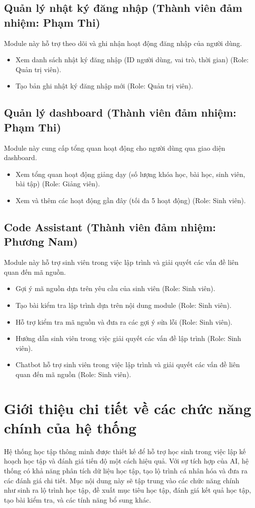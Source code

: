 \subsection{Quản lý nhật ký đăng nhập (Thành viên đảm nhiệm: Phạm Thi)}
Module này hỗ trợ theo dõi và ghi nhận hoạt động đăng nhập của người dùng.
\begin{itemize}[label=--]
    \item Xem danh sách nhật ký đăng nhập (ID người dùng, vai trò, thời gian) (Role: Quản trị viên).
    \item Tạo bản ghi nhật ký đăng nhập mới (Role: Quản trị viên).
\end{itemize}

\subsection{Quản lý dashboard (Thành viên đảm nhiệm: Phạm Thi)}
Module này cung cấp tổng quan hoạt động cho người dùng qua giao diện dashboard.
\begin{itemize}[label=--]
    \item Xem tổng quan hoạt động giảng dạy (số lượng khóa học, bài học, sinh viên, bài tập) (Role: Giảng viên).
    \item Xem và thêm các hoạt động gần đây (tối đa 5 hoạt động) (Role: Sinh viên).
\end{itemize}

\subsection{Code Assistant (Thành viên đảm nhiệm: Phương Nam)}
Module này hỗ trợ sinh viên trong việc lập trình và giải quyết các vấn đề liên quan đến mã nguồn.
\begin{itemize}[label=--]
    \item Gợi ý mã nguồn dựa trên yêu cầu của sinh viên (Role: Sinh viên).
    \item Tạo bài kiểm tra lập trình dựa trên nội dung module (Role: Sinh viên).
    \item Hỗ trợ kiểm tra mã nguồn và đưa ra các gợi ý sửa lỗi (Role: Sinh viên).
    \item Hướng dẫn sinh viên trong việc giải quyết các vấn đề lập trình (Role: Sinh viên).
    \item Chatbot hỗ trợ sinh viên trong việc lập trình và giải quyết các vấn đề liên quan đến mã nguồn (Role: Sinh viên).
\end{itemize}
\section{Giới thiệu chi tiết về các chức năng chính của hệ thống}
Hệ thống học tập thông minh được thiết kế để hỗ trợ học sinh trong việc lập kế hoạch học tập và đánh giá tiến độ một cách hiệu quả. Với sự tích hợp của AI, hệ thống có khả năng phân tích dữ liệu học tập, tạo lộ trình cá nhân hóa và đưa ra các đánh giá chi tiết. Mục nội dung này sẽ tập trung vào các chức năng chính như sinh ra lộ trình học tập, đề xuất mục tiêu học tập, đánh giá kết quả học tập, tạo bài kiểm tra, và các tính năng bổ sung khác. \par 

